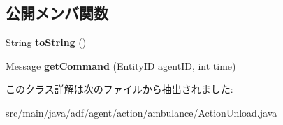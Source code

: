 \subsection*{公開メンバ関数}
\begin{DoxyCompactItemize}
\item 
\hypertarget{classadf_1_1agent_1_1action_1_1ambulance_1_1ActionUnload_ab0181f67b851733bf8246a5265d1d534}{}\label{classadf_1_1agent_1_1action_1_1ambulance_1_1ActionUnload_ab0181f67b851733bf8246a5265d1d534} 
String {\bfseries to\+String} ()
\item 
\hypertarget{classadf_1_1agent_1_1action_1_1ambulance_1_1ActionUnload_aa8d8c9133d2196a3f886e1a87af7ba7a}{}\label{classadf_1_1agent_1_1action_1_1ambulance_1_1ActionUnload_aa8d8c9133d2196a3f886e1a87af7ba7a} 
Message {\bfseries get\+Command} (Entity\+ID agent\+ID, int time)
\end{DoxyCompactItemize}


このクラス詳解は次のファイルから抽出されました\+:\begin{DoxyCompactItemize}
\item 
src/main/java/adf/agent/action/ambulance/Action\+Unload.\+java\end{DoxyCompactItemize}

